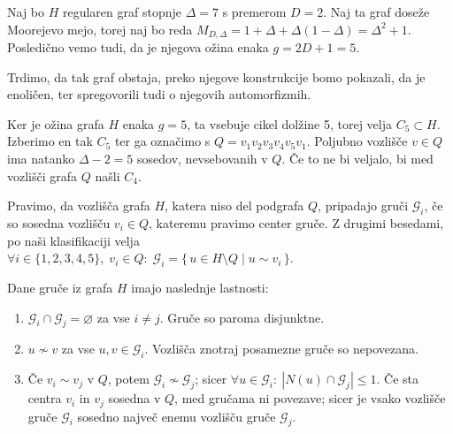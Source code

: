 \documentclass[fin1, tisk]{fmfdelo}
\newcommand{\gr}{\mathscr{G}}
\begin{document}
Naj bo $H$ regularen graf stopnje $\Delta=7$ s premerom $D=2$.
Naj ta graf doseže Moorejevo mejo, torej naj bo reda 
$M_{D, \Delta}=1 + \Delta + \Delta(1-\Delta)=\Delta^2 + 1$.
Posledično vemo tudi, da je njegova ožina enaka $g=2D + 1=5$.

Trdimo, da tak graf obstaja, preko njegove konstrukcije bomo 
pokazali, da je enoličen, ter spregovorili tudi o njegovih 
automorfizmih.

Ker je ožina grafa $H$ enaka $g=5$, ta vsebuje cikel dolžine 5,
torej velja $C_5 \subset H$.
Izberimo en tak $C_5$ ter ga označimo s $Q=v_1 v_2 v_3 v_4 v_5 v_1$. 
Poljubno vozlišče $v \in Q$ ima natanko $\Delta-2=5$ sosedov, 
nevsebovanih v $Q$. Če to ne bi veljalo, bi med vozlišči grafa 
$Q$ našli $C_4$.

Pravimo, da vozlišča grafa $H$, katera niso del podgrafa $Q$, pripadajo
gruči $\gr_i$, če so sosedna vozlišču $v_i \in Q$, kateremu 
pravimo center gruče. Z drugimi besedami, po naši klasifikaciji velja \\
$\forall i \in \{1, 2, 3, 4, 5\},\; v_i \in Q: \; \gr_i = \{\, u \in H \setminus Q \mid u \sim v_i\,\}$.

\begin{trditev}
Dane gruče iz grafa $H$ imajo naslednje lastnosti:
\begin{enumerate}[label=(\Roman*)]
\item \(\gr_i \cap \gr_j = \varnothing\) za vse \(i \neq j\).  
Gruče so paroma disjunktne. \label{itm:g1}
\item \(u \not\sim v\) za vse \(u,v \in \gr_i\).  
Vozlišča znotraj posamezne gruče so nepovezana. \label{itm:g2}
\item Če \(v_i \sim v_j\) v \(Q\), potem \(\gr_i \not\sim \gr_j\); sicer
\(\forall u \in \gr_i: \ |N(u) \cap \gr_j| \leq 1\).
Če sta centra \(v_i\) in \(v_j\) sosedna v \(Q\), med gručama ni povezave; 
sicer je vsako vozlišče gruče \(\gr_i\) sosedno največ enemu vozlišču 
gruče \(\gr_j\). \label{itm:g3}
\end{enumerate}
\end{trditev}
\end{document}
